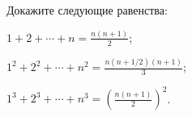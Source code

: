 Докажите следующие равенства:
\begin{enumcyr}
    \item $1 + 2 + \dotsb + n = \frac{n (n + 1)}{2}$;
    \item $1^2 + 2^2 + \dotsb + n^2 = \frac{n (n + 1 / 2)(n + 1)}{3}$;
    \item $1^3 + 2^3 + \dotsb + n^3 = \left( \frac{n (n + 1)}{2} \right)^2$.
\end{enumcyr}
